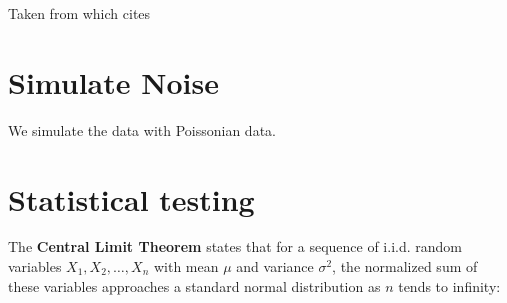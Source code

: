 




Taken from \cite{berteroImageDeblurringPoisson2009} which cites \cite{fellerIntroductionProbabilityTheory1968}
\section{Simulate Noise}
We simulate the data with Poissonian data.
\section{Statistical testing}







The \textbf{Central Limit Theorem} states that for a sequence of i.i.d. random variables \(X_1, X_2, \ldots, X_n\) with mean \( \mu \) and variance \( \sigma^2 \), the normalized sum of these variables approaches a standard normal distribution as \(n\) tends to infinity:

